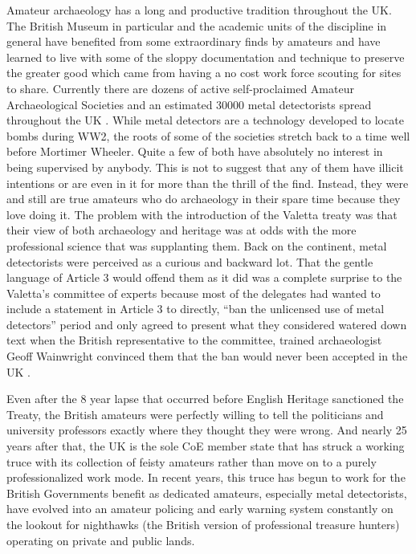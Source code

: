 Amateur archaeology has a long and productive tradition throughout the UK. The British Museum in particular and the academic units of the discipline in general have benefited from some extraordinary finds by amateurs and have learned to live with some of the sloppy documentation and technique to preserve the greater good which came from having a no cost work force scouting for sites to share. Currently there are dozens of active self-proclaimed Amateur Archaeological Societies and an estimated \num{30000} metal detectorists spread throughout the UK \parencites{Roeher_2006}{Potts_2015}. 
While metal detectors are a technology developed to locate bombs during WW2, the roots of some of the societies stretch back to a time well before Mortimer Wheeler. Quite a few of both have absolutely no interest in being supervised by anybody. This is not to suggest that any of them have illicit intentions or are even in it for more than the thrill of the find. Instead, they were and still are true amateurs who do archaeology in their spare time because they love doing it. The problem with the introduction of the Valetta treaty was that their view of both archaeology and heritage was at odds with the more professional science that was supplanting them. Back on the continent, metal detectorists were perceived as a curious and backward lot. That the gentle language of Article 3 would offend them as it did was a complete surprise to the Valetta’s committee of experts because most of the delegates had wanted to include a statement in Article 3 to directly, “ban the unlicensed use of metal detectors” period and only agreed to present what they considered watered down text when the British representative to the committee, trained archaeologist Geoff Wainwright convinced them that the ban would never been accepted in the UK \parencite[62]{Willems_2007}. 

Even after the 8 year lapse that occurred before English Heritage sanctioned the Treaty, the British amateurs were perfectly willing to tell the politicians and university professors exactly where they thought they were wrong. And nearly 25 years after that, the UK is the sole CoE member state that has struck a working truce with its collection of feisty amateurs rather than move on to a purely professionalized work mode. In recent years, this truce has begun to work for the British Governments benefit as dedicated amateurs, especially metal detectorists, have evolved into an amateur policing and early warning system constantly on the lookout for nighthawks (the British version of professional treasure hunters) operating on private and public lands. 

